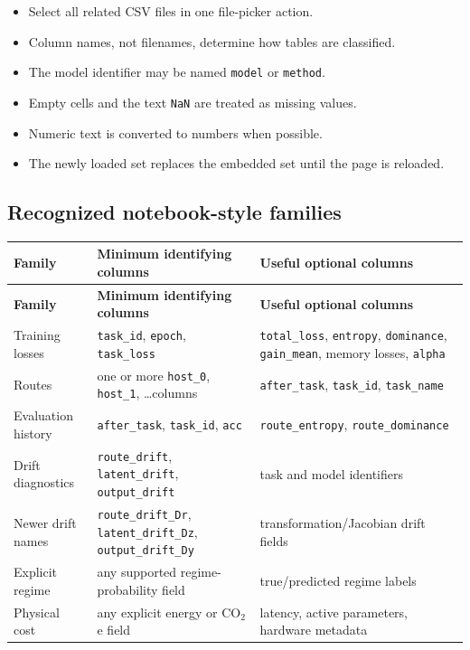 \documentclass[11pt,a4paper]{article}
\newcommand{\code}[1]{\texttt{#1}}
\begin{document}
\begin{itemize}
  \item Select all related CSV files in one file-picker action.
  \item Column names, not filenames, determine how tables are classified.
  \item The model identifier may be named \code{model} or \code{method}.
  \item Empty cells and the text \code{NaN} are treated as missing values.
  \item Numeric text is converted to numbers when possible.
  \item The newly loaded set replaces the embedded set until the page is reloaded.
\end{itemize}

\subsection{Recognized notebook-style families}

\begin{longtable}{@{}P{34mm}P{60mm}P{63mm}@{}}
\toprule
\textbf{Family} & \textbf{Minimum identifying columns} & \textbf{Useful optional columns}\\
\midrule
\endfirsthead
\toprule
\textbf{Family} & \textbf{Minimum identifying columns} & \textbf{Useful optional columns}\\
\midrule
\endhead
Training losses & \code{task\_id}, \code{epoch}, \code{task\_loss} & \code{total\_loss}, \code{entropy}, \code{dominance}, \code{gain\_mean}, memory losses, \code{alpha}\\
Routes & one or more \code{host\_0}, \code{host\_1}, \ldots columns & \code{after\_task}, \code{task\_id}, \code{task\_name}\\
Evaluation history & \code{after\_task}, \code{task\_id}, \code{acc} & \code{route\_entropy}, \code{route\_dominance}\\
Drift diagnostics & \code{route\_drift}, \code{latent\_drift}, \code{output\_drift} & task and model identifiers\\
Newer drift names & \code{route\_drift\_Dr}, \code{latent\_drift\_Dz}, \code{output\_drift\_Dy} & transformation/Jacobian drift fields\\
Explicit regime & any supported regime-probability field & true/predicted regime labels\\
Physical cost & any explicit energy or CO$_2$e field & latency, active parameters, hardware metadata\\
\bottomrule
\end{longtable}
\end{document}
